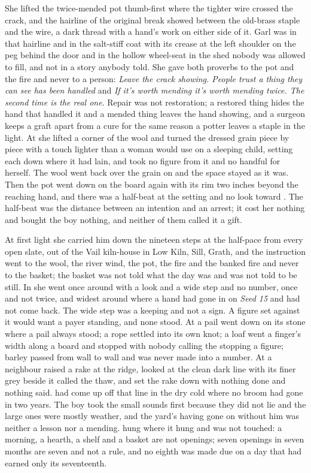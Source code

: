 She lifted the twice-mended pot thumb-first where the tighter wire crossed the crack, and the hairline of the original break showed between the old-brass staple and the wire, a dark thread with a hand's work on either side of it. Garl was in that hairline and in the salt-stiff coat with its crease at the left shoulder on the peg behind the door and in the hollow wheel-seat in the shed nobody was allowed to fill, and not in a story anybody told. She gave both proverbs to the pot and the fire and never to a person: \emph{Leave the crack showing. People trust a thing they can see has been handled} and \emph{If it's worth mending it's worth mending twice. The second time is the real one}. Repair was not restoration; a restored thing hides the hand that handled it and a mended thing leaves the hand showing, and a surgeon keeps a graft apart from a cure for the same reason a potter leaves a staple in the light. At  she lifted a corner of the wool and turned the dressed grain piece by piece with a touch lighter than a woman would use on a sleeping child, setting each down where it had lain, and took no figure from it and no handful for herself. The wool went back over the grain on  and the space stayed as it was. Then the pot went down on the board again with its rim two inches beyond the reaching hand, and there was a half-beat at the setting and no look toward . The half-beat was the distance between an intention and an arrest; it cost her nothing and bought the boy nothing, and neither of them called it a gift.

At first light she carried him down the nineteen steps at the half-pace from every open slate, out of the Vail kiln-house in Low Kiln, Sill, Grath, and the instruction went to the wool, the river wind, the pot, the fire and the banked fire and never to the basket; the basket was not told what the day was and was not told to be still. In  she went once around  with a look and a wide step and no number, once and not twice, and widest around  where a hand had gone in on \emph{Seed 15} and had not come back. The wide step was a keeping and not a sign. A figure set against it would want a payer standing, and none stood. At  a pail went down on its stone where a pail always stood; a rope settled into its own knot; a loaf went a finger's width along a board and stopped with nobody calling the stopping a figure; barley passed from wall to wall and was never made into a number. At  a neighbour raised a rake at the ridge, looked at the clean dark line with its finer grey beside it called the thaw, and set the rake down with nothing done and nothing said.  had come up off that line in the dry cold where no broom had gone in two years. The boy took the small sounds first because they did not lie and the large ones were mostly weather, and the yard's having gone on without him was neither a lesson nor a mending.  hung where it hung and was not touched: a morning, a hearth, a shelf and a basket are not openings; seven openings in seven months are seven and not a rule, and no eighth was made due on a day that had earned only its seventeenth.

